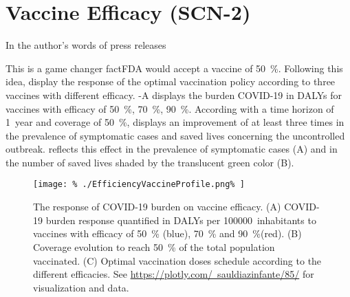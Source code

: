 \section*{Vaccine Efficacy (SCN-2)}
In the author's words of press releases
\begin{quotation}


\end{quotation}
This is a game changer fact\textemdash FDA would accept a vaccine of
\SI{50}{\percent}. Following this idea,
display the response of the optimal vaccination policy according to three
vaccines with different efficacy. -A
displays the burden COVID-19 in DALYs for vaccines with
efficacy of \SI{50}{\percent}, \SI{70}{\percent}, \SI{90}{\percent}.
According with a time horizon of \SI{1}{year} and coverage of
\SI{50}{\percent},  displays an
improvement of at least three times in the prevalence of symptomatic cases
and saved lives concerning the uncontrolled
outbreak.  reflects this
effect in the prevalence of symptomatic cases (A) and in
the number of saved lives shaded by the translucent green color (B).
%
%
\begin{figure*}[htb]
    \centering
    \texttt{[image: \%
        ./EfficiencyVaccineProfile.png\%
    ]}
    \caption[The response of COVID-19 on vaccine efficacy]{
        The response of COVID-19 burden on vaccine efficacy.
        (A) COVID-19 burden response quantified in DALYs per
        \SI{100000}{inhabitants}  to
        vaccines with efficacy of \SI{50}{\percent} (blue),
        \SI{70}{\percent} and \SI{90}{\percent}(red).
        (B) Coverage evolution to reach \SI{50}{\percent} of the total
        population vaccinated.
        (C) Optimal vaccination doses schedule according to the
        different efficacies. See
        \href{https://plotly.com/~sauldiazinfante/85/}{%
            https://plotly.com/~sauldiazinfante/85/} for
        visualization and data.
    }
    \label{fig:efficiencyvaccineprofile}
\end{figure*}
